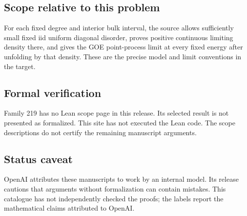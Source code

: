 \documentclass[11pt]{article}
\begin{document}
\subsection{Scope relative to this problem}
For each fixed degree and interior bulk interval, the source allows sufficiently small fixed iid uniform diagonal disorder, proves positive continuous limiting density there, and gives the GOE point-process limit at every fixed energy after unfolding by that density. These are the precise model and limit conventions in the target.

\subsection{Formal verification}
Family 219 has no Lean scope page in this release. Its selected result is not presented as formalized. This site has not executed the Lean code. The scope descriptions do not certify the remaining manuscript arguments.

\subsection{Status caveat}
OpenAI attributes these manuscripts to work by an internal model. Its release cautions that arguments without formalization can contain mistakes. This catalogue has not independently checked the proofs; the labels report the mathematical claims attributed to OpenAI.
\end{document}
